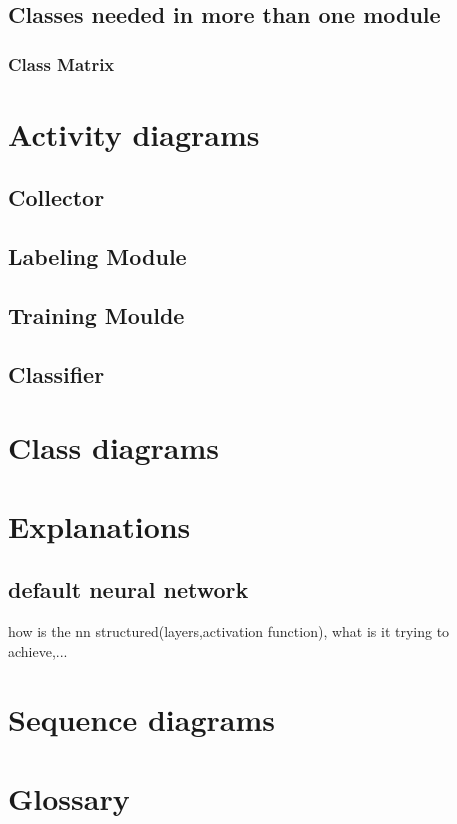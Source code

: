 \documentclass[parskip=full]{scrartcl}
\begin{document}
\subsection{Classes needed in more than one module}
\subsubsection{Class Matrix}


\section{Activity diagrams}


\subsection{Collector}
\subsection{Labeling Module}
\subsection{Training Moulde}

\subsection{Classifier}

\section{Class diagrams}

\section{Explanations}
\subsection{default neural network}
how is the nn structured(layers,activation function), what is it trying to achieve,...


\section{Sequence diagrams}

\section{Glossary}

%
\printnoidxglossaries
\end{document}
